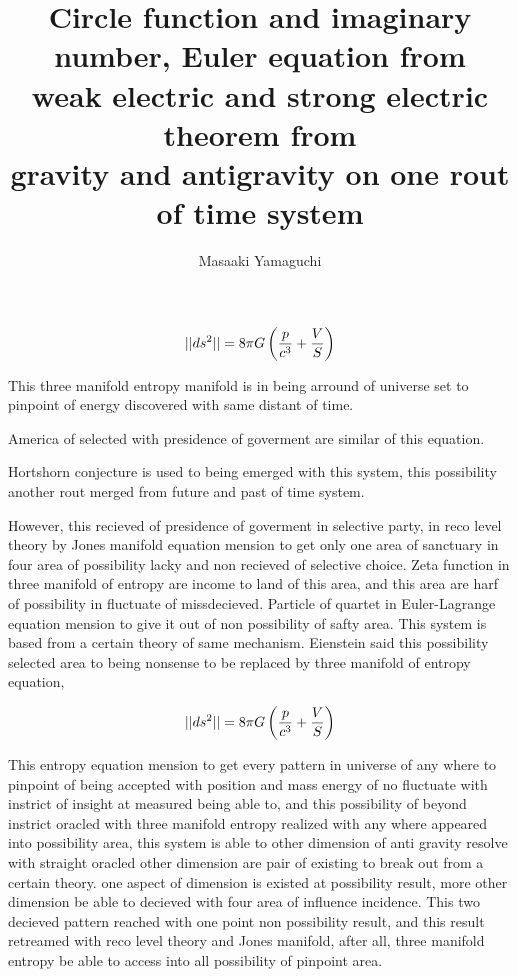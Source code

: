 \documentclass{jsarticle}
\begin{document}
   $$ ||ds^2|| = 8 \pi G\left({p \over c^3} + {V \over S}\right) $$

   This three manifold entropy manifold is in being arround of universe set 
   to pinpoint of energy discovered with same distant of time.

   America of selected with presidence of goverment are similar of this
   equation.

   Hortshorn conjecture is used to being emerged with this system, 
   this possibility another rout merged from future and past of time system.

   However, this recieved of presidence of goverment in selective party,
   in reco level theory by Jones manifold equation mension to get
   only one area of sanctuary in four area of possibility lacky and non
   recieved of selective choice.
   Zeta function in three manifold of entropy are income to land of this area,
   and this area are harf of possibility in fluctuate of missdecieved.
   Particle of quartet in Euler-Lagrange equation mension to give it out of
   non possibility of safty area. This system is based from a certain theory
   of same mechanism.
   Eienstein said this possibility selected area to being nonsense
   to be replaced by three manifold of entropy equation,


   $$ ||ds^2|| = 8 \pi G\left({p \over c^3} + {V \over S}\right) $$

   This entropy equation mension to get every pattern in universe of any where
   to pinpoint of being accepted with position and mass energy of no fluctuate
   with instrict of insight at measured being able to, and this possibility
   of beyond instrict oracled with three manifold entropy realized with
   any where appeared into possibility area, this system is able to 
   other dimension of anti gravity resolve with straight oracled 
   other dimension are pair of existing to break out from a certain theory.
   one aspect of dimension is existed at possibility result,
   more other dimension be able to decieved with four area of influence
   incidence. This two decieved pattern reached with one point non possibility
   result, and this result retreamed with reco level theory and 
   Jones manifold, after all, three manifold entropy be able to access into all 
   possibility of pinpoint area.

\newpage
\title{Circle function and imaginary number, Euler equation from \\
        weak electric and strong electric theorem from \\
	gravity and antigravity on one rout of time system}
\author{Masaaki Yamaguchi}
\end{document}
